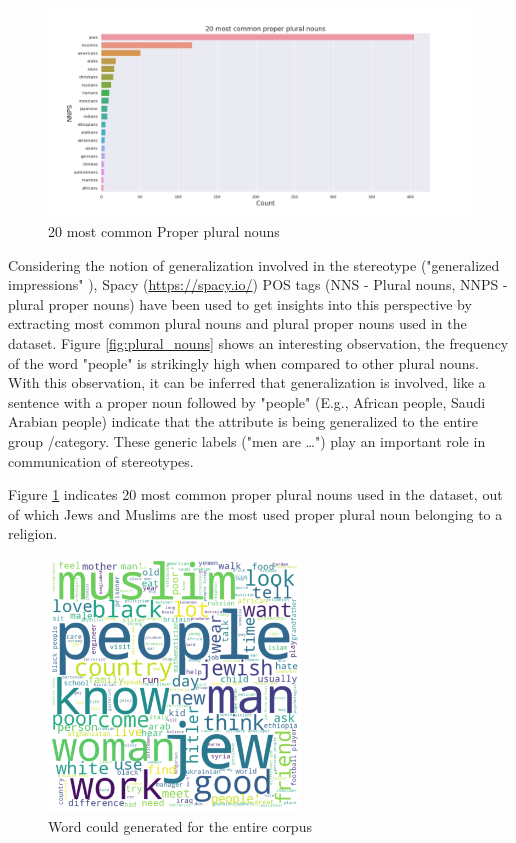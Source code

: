 \begin{figure}[h!]
    \centering
    \includegraphics[width=1\textwidth]{thesis/figures/20 most common proper plural nouns.png}
    \caption{20 most common Proper plural nouns}
    \label{fig:Proper_plural_nouns}
\end{figure}



Considering the notion of generalization involved in the stereotype ("generalized impressions" \cite{burgers2020language}), Spacy (\url{https://spacy.io/}) POS tags (NNS - Plural nouns, NNPS - plural proper nouns) have been used to get insights into this perspective by extracting most common plural nouns and plural proper nouns used in the dataset. Figure \ref{fig:plural_nouns} shows an interesting observation, the frequency of the word "people" is strikingly high when compared to other plural nouns. With this observation, it can be inferred that generalization is involved, like a sentence with a proper noun followed by "people" (E.g., African people, Saudi Arabian people) indicate that the attribute is being generalized to the entire group /category. These generic labels ("men are …") play an important role in communication of stereotypes\cite{burgers2020language}.

\pagebreak
Figure \ref{fig:Proper_plural_nouns} indicates 20 most common proper plural nouns used in the dataset, out of which Jews and Muslims are the most used proper plural noun belonging to a religion.
\begin{figure}[h!]
    \centering
    \includegraphics[width=0.6\textwidth]{thesis/figures/Overall.png}
    \caption{Word could generated for the entire corpus}
    \label{fig:word clouds}
\end{figure}


